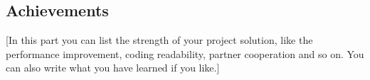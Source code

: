 \documentclass{article}
\begin{document}
\subsection{Achievements}

[In this part you can list the strength of your project solution, like the performance improvement, coding readability, partner cooperation and so on. You can also write what you have learned if you like.]



\end{document}
